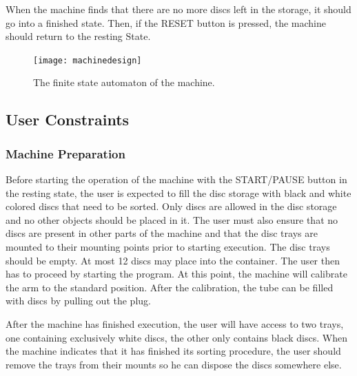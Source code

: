 \documentclass[a4paper,oneside,11pt]{article}
\begin{document}
When the machine finds that there are no more discs left in the storage, it should go into a
finished state. Then, if the RESET button is pressed, the machine should return to the resting
State.

\begin{figure}[H]
	\centering
	\texttt{[image: machinedesign]}
	\caption{\label{machinedesign}The finite state automaton of the machine.}
\end{figure}

\subsection{User Constraints}
\subsubsection{Machine Preparation}
Before starting the operation of the machine with the START/PAUSE button in the resting state, the user is expected to fill the disc storage with black and
white colored discs that need to be sorted. Only discs are allowed in the disc storage and no
other objects should be placed in it. The user must also ensure that no discs are present in
other parts of the machine and that the disc trays are mounted to their mounting points prior
to starting execution. The disc trays should be empty. At most 12 discs may place into the
container. The user then has to proceed by starting the program. At this point, the machine will calibrate the arm to the standard position. After the calibration, the tube can be filled with
discs by pulling out the plug.

After the machine has finished execution, the user will have access to two trays, one containing exclusively white discs, the other only contains black discs. When the machine indicates
that it has finished its sorting procedure, the user should remove the trays from their mounts
so he can dispose the discs somewhere else.
\end{document}
